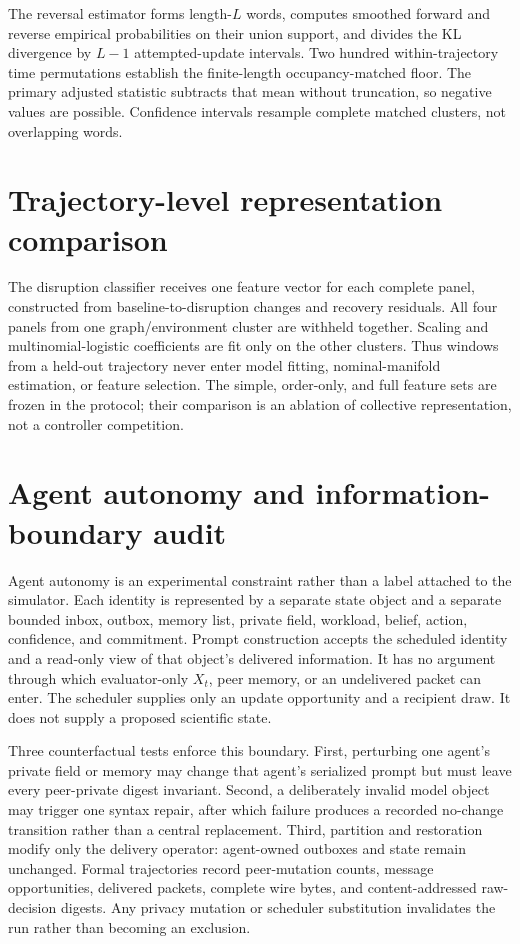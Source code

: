 \documentclass[12pt]{article}
\begin{document}
The reversal estimator forms length-$L$ words, computes smoothed forward and
reverse empirical probabilities on their union support, and divides the KL
divergence by $L-1$ attempted-update intervals. Two hundred within-trajectory
time permutations establish the finite-length occupancy-matched floor. The
primary adjusted statistic subtracts that mean without truncation, so negative
values are possible. Confidence intervals resample complete matched clusters,
not overlapping words.

\section{Trajectory-level representation comparison}

The disruption classifier receives one feature vector for each complete
panel, constructed from baseline-to-disruption changes and recovery residuals.
All four panels from one graph/environment cluster are withheld together.
Scaling and multinomial-logistic coefficients are fit only on the other
clusters. Thus windows from a held-out trajectory never enter model fitting,
nominal-manifold estimation, or feature selection. The simple, order-only, and
full feature sets are frozen in the protocol; their comparison is an ablation
of collective representation, not a controller competition.

\section{Agent autonomy and information-boundary audit}

Agent autonomy is an experimental constraint rather than a label attached to
the simulator.  Each identity is represented by a separate state object and a
separate bounded inbox, outbox, memory list, private field, workload, belief,
action, confidence, and commitment.  Prompt construction accepts the scheduled
identity and a read-only view of that object's delivered information.  It has no
argument through which evaluator-only $X_t$, peer memory, or an undelivered
packet can enter.  The scheduler supplies only an update opportunity and a
recipient draw.  It does not supply a proposed scientific state.

Three counterfactual tests enforce this boundary.  First, perturbing one
agent's private field or memory may change that agent's serialized prompt but
must leave every peer-private digest invariant.  Second, a deliberately invalid
model object may trigger one syntax repair, after which failure produces a
recorded no-change transition rather than a central replacement.  Third,
partition and restoration modify only the delivery operator: agent-owned
outboxes and state remain unchanged.  Formal trajectories record peer-mutation
counts, message opportunities, delivered packets, complete wire bytes, and
content-addressed raw-decision digests.  Any privacy mutation or scheduler
substitution invalidates the run rather than becoming an exclusion.
\end{document}
